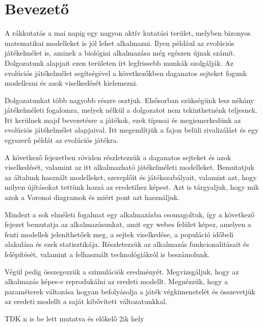 \chapter{Bevezető}

A rákkutatás a mai napig egy nagyon aktív kutatási terület, melyben bizonyos matematikai modelleket is jól lehet alkalmazni. Ilyen például az evolúciós játékelmélet is, aminek a biológiai alkalmazása még egészen újnak számít. Dolgozatunk alapjait ezen területen írt legfrissebb munkák szolgálják. Az evolúciós játékelmélet segítségével a következőkben daganatos sejteket fogunk  modellezni és azok viselkedését kielemezni.

Dolgozatunkat több nagyobb részre osztjuk. Elsősorban szükségünk lesz néhány játékelméleti fogalomra, melyek nélkül a dolgozatot nem tekinthetnénk teljesnek. Itt kerülnek majd bevezetésre a játékok, ezek típusai és megismerkedünk az evolúciós játékelmélet alapjaival. Itt megemlítjük a fajon belüli rivalizálást és egy egyszerű példát az evolúciós játékra.

A következő fejezetben röviden részletezzük a daganatos sejteket és azok viselkedését, valamint az itt alkalmazható játékelméleti modelleket. Bemutatjuk az általunk használt modelleket, szereplőit és játékszabályait, valamint azt, hogy milyen újításokat tettünk hozzá az eredetihez képest. Azt is tárgyaljuk, hogy mik azok a Voronoi diagramok és miért pont azt használjuk.

Mindezt a sok elméleti fogalmat egy alkalmazásba csomagoltuk, így a következő fejezet bemutatja az alkalmazásunkat, amit egy webes felület képez, amelyen a fenti modellek jeleníthetőek meg, a sejtek viselkedése, a populáció időbeli alakulása és ezek statisztikája. Részletezzük az alkalmazás funkcionalitásait és felépítését, valamint a felhasznált technológiákról is beszámolunk.

Végül pedig összegezzük a szimulációk eredményét. Megvizsgáljuk, hogy az alkalmazás képes-e reprodukálni az eredeti modellt. Megnézzük, hogy a paraméterek változása hogyan befolyásolja a játék végkimenetelét és összevetjük az eredeti modellt a saját kibővített változatunkkal.

TDK n is be lett mutatva és előkelő 2ik hely